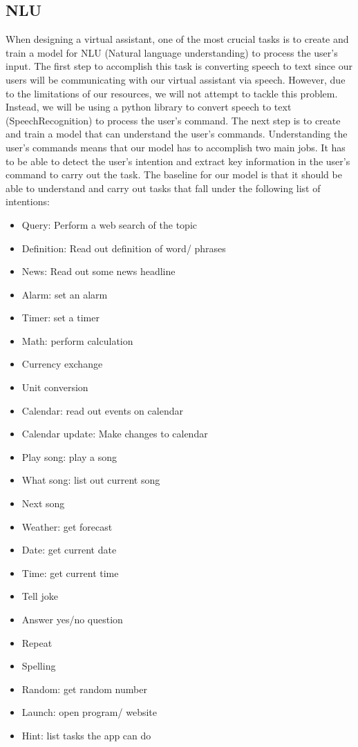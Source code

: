 \subsection{NLU}
When designing a virtual assistant, one of the most crucial tasks is to create and train a model for NLU (Natural language understanding) to process the user's input. The first step to accomplish this task is converting speech to text since our users will be communicating with our virtual assistant via speech. However, due to the limitations of our resources, we will not attempt to tackle this problem. Instead, we will be using a python library to convert speech to text (SpeechRecognition) to process the user's command.
\newline
\indent The next step is to create and train a model that can understand the user's commands. Understanding the user's commands means that our model has to accomplish two main jobs. It has to be able to detect the user's intention and extract key information in the user's command to carry out the task. The baseline for our model is that it should be able to understand and carry out tasks that fall under the following list of intentions:
\begin{itemize}
    \item Query: Perform a web search of the topic 
    \item Definition: Read out definition of word/ phrases
    \item News: Read out some news headline
    \item Alarm: set an alarm
    \item Timer: set a timer
    \item Math: perform calculation
    \item Currency exchange
    \item Unit conversion
    \item Calendar: read out events on calendar
    \item Calendar update: Make changes to calendar
    \item Play song: play a song
    \item What song: list out current song
    \item Next song
    \item Weather: get forecast
    \item Date: get current date
    \item Time: get current time
    \item Tell joke
    \item Answer yes/no question
    \item Repeat
    \item Spelling
    \item Random: get random number  
    \item Launch: open program/ website
    \item Hint: list tasks the app can do
\end{itemize}
